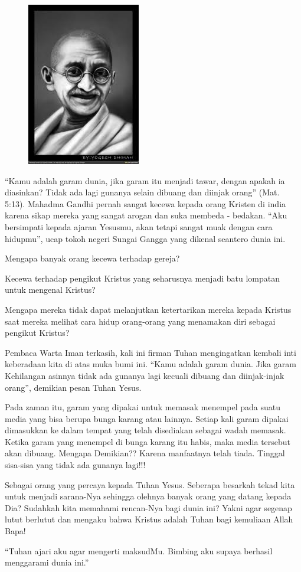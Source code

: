 \small
\begin{figure}
\includegraphics[scale=0.45]{gambar/gandhi.png}
\end{figure}
``Kamu adalah garam dunia, jika garam itu menjadi tawar, dengan apakah ia diasinkan? Tidak ada lagi gunanya selain dibuang dan diinjak orang'' (Mat. 5:13).
Mahadma Gandhi pernah sangat kecewa kepada orang Kristen di india karena sikap mereka yang sangat arogan dan suka membeda - bedakan. ``Aku bersimpati kepada ajaran Yesusmu, akan tetapi sangat muak dengan cara hidupmu'', ucap tokoh negeri Sungai Gangga yang dikenal seantero dunia ini. 

Mengapa banyak orang kecewa terhadap gereja?

Kecewa terhadap pengikut Kristus yang seharusnya menjadi batu lompatan untuk mengenal Kristus?

Mengapa mereka tidak dapat melanjutkan ketertarikan mereka kepada Kristus saat mereka melihat cara hidup orang-orang yang menamakan diri sebagai pengikut Kristus?

Pembaca Warta Iman terkasih, kali ini firman Tuhan mengingatkan kembali inti keberadaan kita di atas muka bumi ini. ``Kamu adalah garam dunia. Jika garam Kehilangan asinnya tidak ada gunanya lagi kecuali dibuang dan diinjak-injak orang'', demikian pesan Tuhan Yesus.

Pada zaman itu, garam yang dipakai untuk memasak menempel pada suatu media yang bisa berupa bunga karang atau lainnya. Setiap kali garam dipakai dimasukkan ke dalam tempat yang telah disediakan sebagai wadah memasak. Ketika garam yang menempel di bunga karang itu habis, maka media tersebut akan dibuang. Mengapa Demikian?? Karena manfaatnya telah tiada. Tinggal sisa-sisa yang tidak ada gunanya lagi!!!

Sebagai orang yang percaya kepada Tuhan Yesus. Seberapa besarkah tekad kita untuk menjadi sarana-Nya sehingga olehnya banyak orang yang datang kepada Dia? Sudahkah kita memahami rencan-Nya bagi dunia ini? Yakni agar segenap lutut berlutut dan mengaku bahwa Kristus adalah Tuhan bagi kemuliaan Allah Bapa!

\begin{center}
``Tuhan ajari aku agar mengerti maksudMu. Bimbing aku supaya berhasil 
menggarami dunia ini.''
\end{center}

\normalsize
